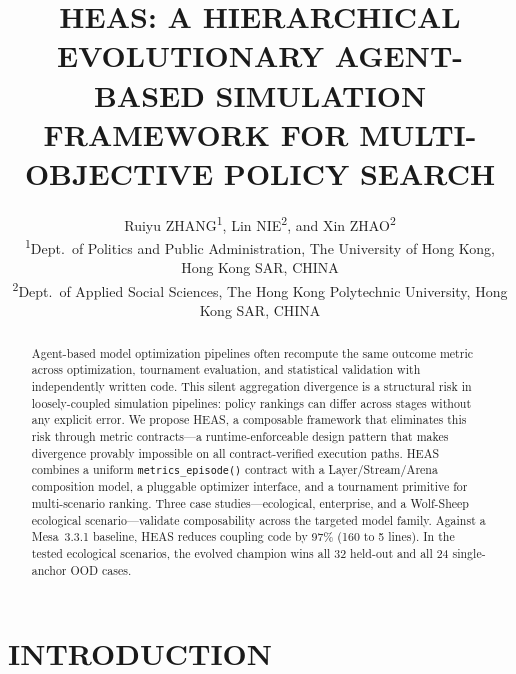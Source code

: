 \documentclass{wscpaperproc}
\begin{document}

\title{HEAS: A HIERARCHICAL EVOLUTIONARY AGENT-BASED SIMULATION FRAMEWORK
       FOR MULTI-OBJECTIVE POLICY SEARCH}

\author{\begin{center}Ruiyu ZHANG\textsuperscript{1}, Lin NIE\textsuperscript{2}, and Xin ZHAO\textsuperscript{2}\\
[11pt]
\textsuperscript{1}Dept.~of Politics and Public Administration, The University of Hong Kong, Hong Kong SAR, CHINA\\
\textsuperscript{2}Dept.~of Applied Social Sciences, The Hong Kong Polytechnic University, Hong Kong SAR, CHINA\end{center}
}

\maketitle

\vspace{-12pt}

\begin{abstract}
Agent-based model optimization pipelines often recompute the same outcome metric
across optimization, tournament evaluation, and statistical validation with
independently written code. This silent aggregation divergence is a structural
risk in loosely-coupled simulation pipelines: policy rankings can differ across
stages without any explicit error. We propose HEAS, a composable framework that
eliminates this risk through metric contracts---a runtime-enforceable design
pattern that makes divergence provably impossible on all contract-verified
execution paths. HEAS combines a uniform \texttt{metrics\_episode()} contract
with a Layer/Stream/Arena composition model, a pluggable optimizer interface,
and a tournament primitive for multi-scenario ranking. Three case
studies---ecological, enterprise, and a Wolf-Sheep ecological scenario---validate
composability across the targeted model family. Against a Mesa~3.3.1 baseline,
HEAS reduces coupling code by 97\% (160 to 5 lines). In the tested ecological
scenarios, the evolved champion wins all 32 held-out and all 24 single-anchor
OOD cases.
\end{abstract}

\section{INTRODUCTION}
\end{document}
